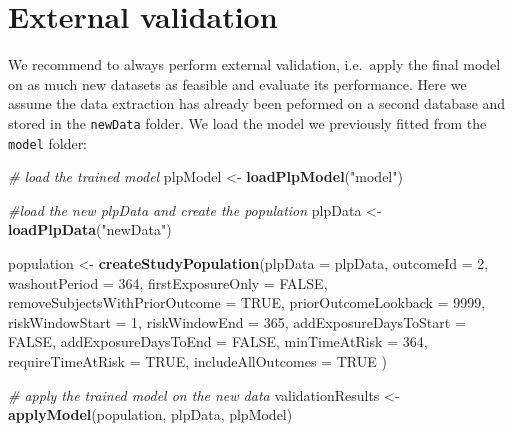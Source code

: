 \documentclass[]{book}
\newenvironment{Shaded}{\begin{snugshade}}{\end{snugshade}}
\newcommand{\KeywordTok}[1]{\textcolor[rgb]{0.13,0.29,0.53}{\textbf{#1}}}
\newcommand{\DataTypeTok}[1]{\textcolor[rgb]{0.13,0.29,0.53}{#1}}
\newcommand{\DecValTok}[1]{\textcolor[rgb]{0.00,0.00,0.81}{#1}}
\newcommand{\StringTok}[1]{\textcolor[rgb]{0.31,0.60,0.02}{#1}}
\newcommand{\CommentTok}[1]{\textcolor[rgb]{0.56,0.35,0.01}{\textit{#1}}}
\newcommand{\OtherTok}[1]{\textcolor[rgb]{0.56,0.35,0.01}{#1}}
\newcommand{\NormalTok}[1]{#1}
\begin{document}
\section{External validation}\label{external-validation}

We recommend to always perform external validation, i.e.~apply the final
model on as much new datasets as feasible and evaluate its performance.
Here we assume the data extraction has already been peformed on a second
database and stored in the \texttt{newData} folder. We load the model we
previously fitted from the \texttt{model} folder:

\begin{Shaded}
\begin{Highlighting}[]
\CommentTok{# load the trained model}
\NormalTok{plpModel <-}\StringTok{ }\KeywordTok{loadPlpModel}\NormalTok{(}\StringTok{"model"}\NormalTok{)}

\CommentTok{#load the new plpData and create the population}
\NormalTok{plpData <-}\StringTok{ }\KeywordTok{loadPlpData}\NormalTok{(}\StringTok{"newData"}\NormalTok{)}

\NormalTok{population <-}\StringTok{ }\KeywordTok{createStudyPopulation}\NormalTok{(}\DataTypeTok{plpData =}\NormalTok{ plpData,}
                                    \DataTypeTok{outcomeId =} \DecValTok{2}\NormalTok{,}
                                    \DataTypeTok{washoutPeriod =} \DecValTok{364}\NormalTok{,}
                                    \DataTypeTok{firstExposureOnly =} \OtherTok{FALSE}\NormalTok{,}
                                    \DataTypeTok{removeSubjectsWithPriorOutcome =} \OtherTok{TRUE}\NormalTok{,}
                                    \DataTypeTok{priorOutcomeLookback =} \DecValTok{9999}\NormalTok{,}
                                    \DataTypeTok{riskWindowStart =} \DecValTok{1}\NormalTok{,}
                                    \DataTypeTok{riskWindowEnd =} \DecValTok{365}\NormalTok{,}
                                    \DataTypeTok{addExposureDaysToStart =} \OtherTok{FALSE}\NormalTok{,}
                                    \DataTypeTok{addExposureDaysToEnd =} \OtherTok{FALSE}\NormalTok{,}
                                    \DataTypeTok{minTimeAtRisk =} \DecValTok{364}\NormalTok{,}
                                    \DataTypeTok{requireTimeAtRisk =} \OtherTok{TRUE}\NormalTok{,}
                                    \DataTypeTok{includeAllOutcomes =} \OtherTok{TRUE}
\NormalTok{)}

\CommentTok{# apply the trained model on the new data}
\NormalTok{validationResults <-}\StringTok{ }\KeywordTok{applyModel}\NormalTok{(population, plpData, plpModel)}
\end{Highlighting}
\end{Shaded}
\end{document}
